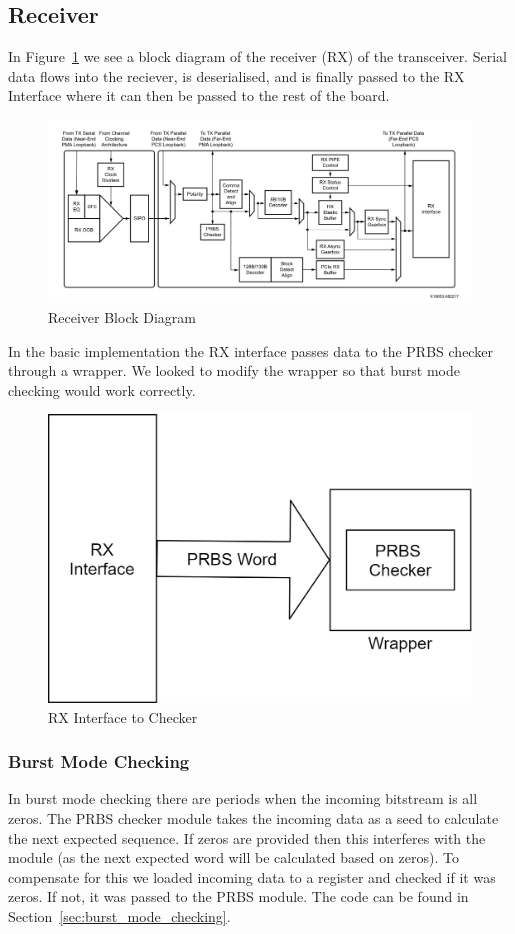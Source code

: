 \subsection{Receiver}%
\label{sub:receiver}
In Figure~\ref{fig:receiver_block} we see a block diagram of the receiver
(RX) of the transceiver. Serial data flows into the reciever, is deserialised,
and is finally passed to the RX Interface where it can then be passed to the
rest of the board. 
\begin{figure}[ht]
    \centering
    \hspace*{-1cm}\includegraphics[width=1.2\linewidth]{img/receiver_block.png}
    \caption{Receiver Block Diagram \cite{GTY_guide}}%
    \label{fig:receiver_block}
\end{figure}

In the basic implementation the RX interface passes data to the PRBS checker
through a wrapper. We looked to modify the wrapper so that burst mode checking
would work correctly.
\begin{figure}[ht]
    \centering
    \includegraphics[width=0.6\linewidth]{img/rx_interface.png}
    \caption{RX Interface to Checker}%
    \label{fig:rx_interface}
\end{figure}
\cleardoublepage
\subsubsection{Burst Mode Checking}%
\label{ssub:burst_mode_checking}
In burst mode checking there are periods when the incoming bitstream is all
zeros. The PRBS checker module takes the incoming data as a seed to calculate
the next expected sequence. If zeros are provided then this interferes with the
module (as the next expected word will be calculated based on zeros). To
compensate for this we loaded incoming data to a register and checked if it was
zeros. If not, it was passed to the PRBS module.
The code can be found in Section~\ref{sec:burst_mode_checking}.  

